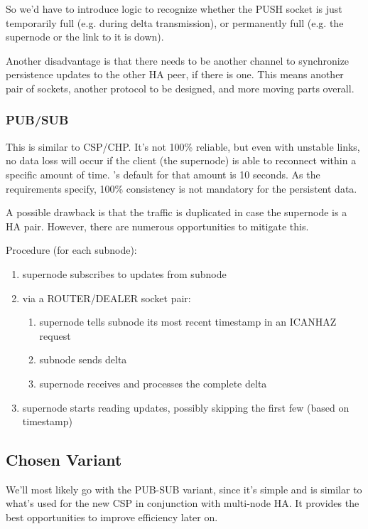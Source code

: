 So we'd have to introduce logic to recognize whether the PUSH
socket is just temporarily full (e.g. during delta transmission), or
permanently full (e.g. the supernode or the link to it is down).

Another disadvantage is that there needs to be another channel to synchronize
persistence updates to the other HA peer, if there is one. This means another
pair of sockets, another protocol to be designed, and more moving parts
overall.

\subsubsection{PUB/SUB}
This is similar to \gls{CSP}/\gls{CHP}. It's not 100\% reliable, but even with unstable
links, no data loss will occur if the client (the supernode) is able to reconnect within a
specific amount of time. \zmq's default for that amount is 10 seconds. As the
requirements specify, 100\% consistency is not mandatory for the persistent
data.

A possible drawback is that the traffic is duplicated in case the supernode
is a HA pair. However, there are numerous opportunities to mitigate this.

Procedure (for each subnode):
\begin{enumerate}
	\item supernode subscribes to updates from subnode
	\item via a ROUTER/DEALER socket pair:
		\begin{enumerate}
			\item supernode tells subnode its most recent timestamp in an ICANHAZ request
			\item subnode sends delta
			\item supernode receives and processes the complete delta
		\end{enumerate}
	\item supernode starts reading updates, possibly skipping the first few (based on timestamp)
\end{enumerate}

\subsection{Chosen Variant}
We'll most likely go with the PUB-SUB variant, since it's simple and is similar to
what's used for the new \gls{CSP} in conjunction with multi-node \gls{HA}. It provides the best
opportunities to improve efficiency later on.

